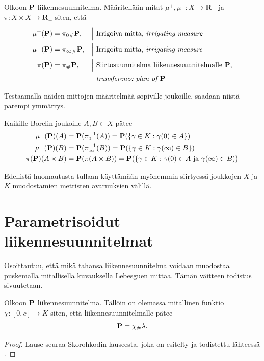\documentclass[12pt,oneside,a4paper]{amsbook} %
\begin{document}
\begin{definition}
    Olkoon $\P$ liikennesuunnitelma. Määritellään mitat $\mu^+, \mu^- : X \to \mathbf{R}_+$ ja $\pi: X\times X \to \mathbf{R}_+$ siten, että
    \begin{align*}
        \mu^+(\P) &= \pi_{0\#} \P,  &&\Big| \text{ Irrigoiva mitta, \textit{irrigating measure} }\\
        \mu^-(\P) &= \pi_{\infty \#} \P,  &&\Big| \text{ Irrigoitu mitta, \textit{irrigating measure} }\\
        \pi(\P) &= \pi_\# \P,  &&\Big| \text{ Siirtosuunnitelma liikennesuunnitelmalle $\P$,}\\ 
        & &&\hphantom{\Big|} \text{ \textit{transference plan of $\P$}}
    \end{align*}
\end{definition}

Testaamalla näiden mittojen määritelmää sopiville joukoille, saadaan niistä parempi ymmärrys.

\begin{remark}
    Kaikille Borelin joukoille $A, B \subset X$ pätee
    \begin{align*}
        \mu^+(\P)(A) &= \P(\pi_0^{-1}(A)) = \P(\{\gamma \in K : \gamma(0) \in A\}) \\
        \mu^-(\P)(B) &= \P(\pi_\infty^{-1}(B)) = \P(\{\gamma \in K : \gamma(\infty) \in B\}) \\
        \pi(\P)(A\times B) &= \P(\pi(A\times B)) = \P(\{\gamma \in K: \gamma(0) \in A\text{ ja } \gamma(\infty) \in B)\}
    \end{align*}
\end{remark}

Edellistä huomautusta tullaan käyttämään myöhemmin siirtyessä joukkojen $X$ ja $K$ muodostamien metristen avaruuksien välillä.

\section{Parametrisoidut liikennesuunnitelmat}

Osoittautuu, että mikä tahansa liikennesuunnitelma voidaan muodostaa puskemalla mitallisella kuvauksella Lebesguen mittaa. Tämän väitteen todistus sivuutetaan.

\begin{theorem}\label{thm:skorohkod}
    Olkoon $\P$ liikennesuunnitelma. Tällöin on olemassa mitallinen funktio $\chi: [0, c] \to K$ siten, että liikennesuunnitelmalle pätee $$\P =\chi_\# \lambda.$$
\end{theorem}
\begin{proof}
    Lause seuraa Skorohkodin lauseesta, joka on esitelty ja todistettu lähteessä \cite[s. 185]{optimal}.
\end{proof}
\end{document}
